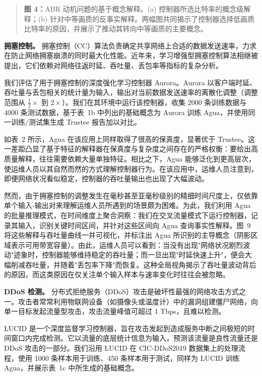 \documentclass[11pt,a4paper]{article}
\begin{document}
\begin{quote}\small\noindent\textbf{图 4：}ABR 动机问题的基于概念解释。(a) 控制器所选比特率的概念级解释；(b) 针对中等画质的反事实解释。两幅图共同揭示了控制器选择低画质比特率的原因，并展示了推动其转向中等画质的主要概念。\end{quote}

\textbf{拥塞控制。} 拥塞控制（CC）算法负责确定共享网络上合适的数据发送速率，力求在防止网络拥塞崩溃的同时最大化性能。近年来，学习增强型拥塞控制算法相继被提出，它们依赖对网络往返时延、吞吐量、丢包率等指标的复杂分析。

我们评估了用于拥塞控制的深度强化学习控制器 Aurora。Aurora 以客户端时延、吞吐量与丢包相关的统计量为输入，输出对当前数据发送速率的离散化调整（调整范围从 $\tfrac12\times$ 到 $2\times$）。我们在其环境中运行该控制器，收集 2000 条训练数据与 4000 条测试数据，基于表~1b 中列出的基础概念为 Aurora 训练 Agua，并使用同一训练/测试集生成 Trustee 报告加以对比。

如表~2 所示，Agua 在该应用上同样取得了很高的保真度，显著优于 Trustee。这一差距凸显了基于特征的解释器在保真度与复杂度之间存在的严格权衡：要给出高质量解释，往往需要依赖大量单独特征。相比之下，Agua 能够泛化到更高层次，使运维人员以其自然而然的方式理解控制器行为。在该应用中，运维人员注意到，即便网络状况看似稳定，控制器的吞吐量输出也出现了大幅波动。

然而，由于拥塞控制的调整发生在毫秒甚至亚毫秒级别的精细时间尺度上，仅依靠单个输入-输出对来理解运维人员所遇到的场景颇为困难。为此，我们利用 Agua 的批量推理模式，在时间维度上聚合洞察：我们在交叉流量模式下运行控制器，记录其输入，识别关键时间区间，并针对这些区间向 Agua 查询事实性解释。图~9 将这些解释与吞吐量曲线一并可视化，并标注出 Agua 所识别的主导概念（阴影区域表示可用带宽容量）。由此，运维人员可以看到：当没有出现"网络状况剧烈波动"迹象时，控制器能够维持稳定的吞吐量；而一旦出现"时延快速上升"，便会大幅削减吞吐量，并随着"丢包率下降"而恢复。这种全局视角揭示了吞吐量波动背后的原因，而这类原因在仅关注单个输入样本与速率变化时往往会被忽略。

\textbf{DDoS 检测。} 分布式拒绝服务（DDoS）攻击是破坏性最强的网络攻击方式之一。攻击者常常利用物联网设备（如摄像头或温度计）中的漏洞组建僵尸网络，向单一目标发起流量型攻击，攻击流量峰值可超过 1 Tbps，且难以检测。

LUCID 是一个深度监督学习控制器，旨在攻击发起到造成服务中断之间极短的时间窗口内完成检测。它以流量的底层统计信息为输入，预测该流量是良性流量还是 DDoS 攻击的一部分。我们沿用 LUCID 在 CIC-DDoS2019 数据集上的处理流程，使用 1000 条样本用于训练、450 条样本用于测试，同样为 LUCID 训练 Agua，并展示表~1c 中所生成的基础概念。
\end{document}
